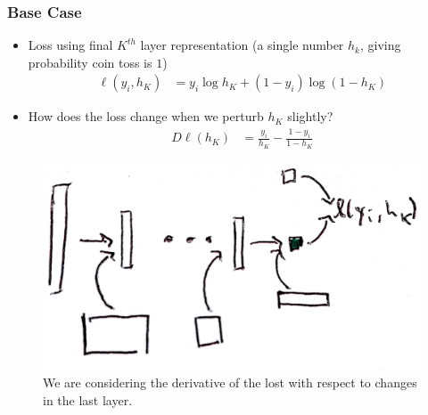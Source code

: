 \documentclass[10pt,mathserif]{beamer}
\begin{document}
\begin{frame}
  \frametitle{Base Case}
  \begin{itemize}
  \item Loss using final $K^{th}$ layer representation (a single number $h_k$,
    giving probability coin toss is $1$)
    \begin{align*}
      \ell\left(y_i, h_K\right) &= y_i \log h_{K} + \left(1 - y_i\right)\log\left(1 - h_{K}\right)
    \end{align*}
  \item How does the loss change when we perturb $h_{K}$ slightly?
    \begin{align*}
      D \ell\left(h_{K}\right) &= \frac{y_i}{h_K} - \frac{1 - y_i}{1 - h_K}
    \end{align*}
  \end{itemize}
\begin{figure}[ht]
  \centering
  \includegraphics[width=0.5\paperwidth]{figure/backprop_last_layer}
  \caption{We are considering the derivative of the lost with respect to changes
    in the last layer. \label{fig:backprop_last_layer} }
\end{figure}
\end{frame}
\end{document}
